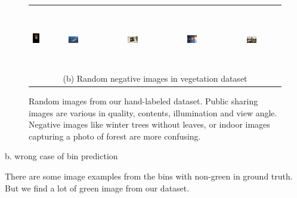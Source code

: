 \begin{figure}[th]
{{\begin{center}
\begin{tabular}{@{}c@{\,\,\,}c@{\,\,\,}c@{\,\,\,}c@{\,\,\,}c@{\,\,\,}}
\\[-6pt]
\hline
\\[-6pt]
\includegraphics[height=1in]{imggrid/datasetnega/6.jpg} &
\includegraphics[width=0.19\textwidth]{imggrid/datasetnega/7.jpg} &
\includegraphics[width=0.19\textwidth]{imggrid/datasetnega/8.jpg} &
\includegraphics[width=0.19\textwidth]{imggrid/datasetnega/9.jpg} &
\includegraphics[width=0.19\textwidth]{imggrid/datasetnega/10.jpg} \\
\multicolumn{5}{c}{(b) Random negative images in vegetation dataset} \\
\end{tabular}
\end{center}
}}
\caption{Random images from our hand-labeled dataset. Public sharing images are various in quality, contents, illumination and view angle.
Negative images like winter trees without leaves, or indoor images capturing a photo of forest are more confusing.}
\label{fig:dataset}
\end{figure}

b. wrong case of bin prediction

There are some image examples from the bins with non-green in ground truth. But we find a lot of 
green image from our dataset.

